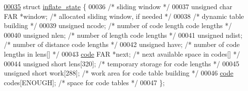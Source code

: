 \begin{DoxyCode}
\hyperlink{structinflate__state}{00035} \textcolor{keyword}{struct }\hyperlink{structinflate__state}{inflate\_state} \{
00036         \textcolor{comment}{/* sliding window */}
00037     \textcolor{keywordtype}{unsigned} \textcolor{keywordtype}{char} FAR *window;  \textcolor{comment}{/* allocated sliding window, if needed */}
00038         \textcolor{comment}{/* dynamic table building */}
00039     \textcolor{keywordtype}{unsigned} ncode;             \textcolor{comment}{/* number of code length code lengths */}
00040     \textcolor{keywordtype}{unsigned} nlen;              \textcolor{comment}{/* number of length code lengths */}
00041     \textcolor{keywordtype}{unsigned} ndist;             \textcolor{comment}{/* number of distance code lengths */}
00042     \textcolor{keywordtype}{unsigned} have;              \textcolor{comment}{/* number of code lengths in lens[] */}
00043     \hyperlink{structcode}{code} FAR *next;             \textcolor{comment}{/* next available space in codes[] */}
00044     \textcolor{keywordtype}{unsigned} \textcolor{keywordtype}{short} lens[320];   \textcolor{comment}{/* temporary storage for code lengths */}
00045     \textcolor{keywordtype}{unsigned} \textcolor{keywordtype}{short} work[288];   \textcolor{comment}{/* work area for code table building */}
00046     \hyperlink{structcode}{code} codes[ENOUGH];         \textcolor{comment}{/* space for code tables */}
00047 \};
\end{DoxyCode}
